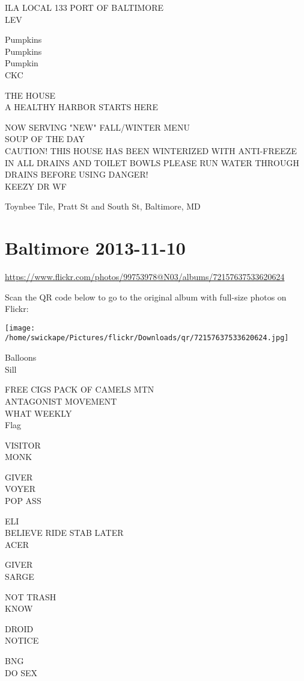 \documentclass[10pt,letterpaper]{article}
\begin{document}
ILA LOCAL 133 PORT OF BALTIMORE\\
LEV

Pumpkins\\
Pumpkins\\
Pumpkin\\
CKC

THE HOUSE\\
A HEALTHY HARBOR STARTS HERE

NOW SERVING "NEW" FALL/WINTER MENU\\
SOUP OF THE DAY\\
CAUTION! THIS HOUSE HAS BEEN WINTERIZED WITH ANTI{-}FREEZE IN ALL DRAINS AND TOILET BOWLS PLEASE RUN WATER THROUGH DRAINS BEFORE USING DANGER!\\
KEEZY DR WF

Toynbee Tile, Pratt St and South St, Baltimore, MD
\pagebreak

\section*{Baltimore 2013-11-10}

\url{https://www.flickr.com/photos/99753978@N03/albums/72157637533620624}

Scan the QR code below to go to the original album with full-size photos on Flickr:

\texttt{[image: /home/swickape/Pictures/flickr/Downloads/qr/72157637533620624.jpg]}
\pagebreak

Balloons\\
Sill

FREE CIGS PACK OF CAMELS MTN\\
ANTAGONIST MOVEMENT\\
WHAT WEEKLY\\
Flag

VISITOR\\
MONK

GIVER\\
VOYER\\
POP ASS

ELI\\
BELIEVE RIDE STAB LATER\\
ACER

GIVER\\
SARGE

NOT TRASH\\
KNOW

DROID\\
NOTICE

BNG\\
DO SEX
\end{document}
